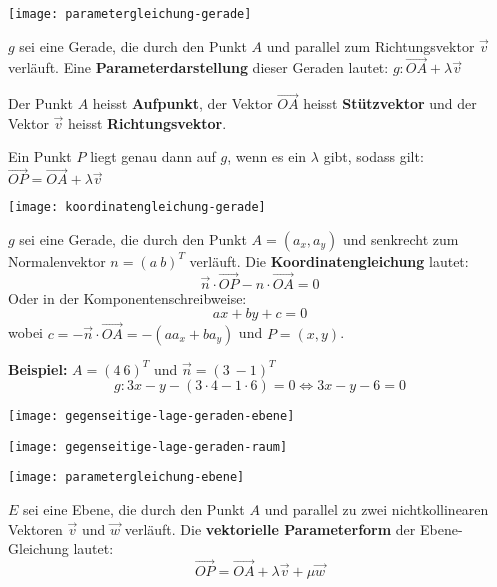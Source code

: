 

\vspace{0.5em}
\begin{multicols}{2}
    \texttt{[image: parametergleichung-gerade]}

    $g$ sei eine Gerade, die durch den Punkt $A$ und parallel zum Richtungsvektor $\vec{v}$ verläuft.
    Eine \textbf{Parameterdarstellung} dieser Geraden lautet:
    $g: \vec{OA} + \lambda \vec{v}$
\end{multicols}

Der Punkt $A$ heisst \textbf{Aufpunkt}, der Vektor $\vec{OA}$ heisst \textbf{Stützvektor} und der Vektor $\vec{v}$ heisst \textbf{Richtungsvektor}.

Ein Punkt $P$ liegt genau dann auf $g$, wenn es ein $\lambda$ gibt, sodass gilt:
$\vec{OP} = \vec{OA} + \lambda \vec{v}$


\begin{center}
    \texttt{[image: koordinatengleichung-gerade]}
\end{center}

$g$ sei eine Gerade, die durch den Punkt $A = (a_x, a_y)$ und senkrecht zum Normalenvektor $n = (a \ b)^T$ verläuft.
Die \textbf{Koordinatengleichung} lautet:
\[\vec{n} \cdot \vec{OP} - n \cdot \vec{OA} = 0\]
Oder in der Komponentenschreibweise:
\[ax + by + c = 0\]
wobei $c = -\vec{n} \cdot \vec{OA} = -(a a_x + b a_y)$ und $P = (x, y)$.

\textbf{Beispiel:} $A = (4 \ 6)^T$ und $\vec{n} = (3 \ -1)^T$
\[g: 3x - y - (3 \cdot 4 - 1 \cdot 6) = 0 \Leftrightarrow 3x - y - 6 = 0\]



\texttt{[image: gegenseitige-lage-geraden-ebene]}


\texttt{[image: gegenseitige-lage-geraden-raum]}



\vspace{0.5em}
\begin{multicols}{2}
    \texttt{[image: parametergleichung-ebene]}

    $E$ sei eine Ebene, die durch den Punkt $A$ und parallel zu zwei nichtkollinearen Vektoren $\vec{v}$ und $\vec{w}$ verläuft.
    Die \textbf{vektorielle Parameterform} der Ebene-Gleichung lautet:
    \[\vec{OP} = \vec{OA} + \lambda \vec{v} + \mu \vec{w}\]
\end{multicols}


